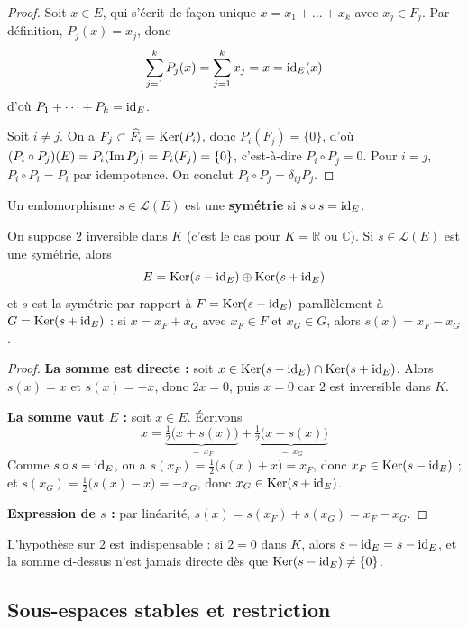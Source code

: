 \begin{proof}
Soit $x\in E$, qui s'écrit de façon unique $x=x_1+\dots+x_k$ avec $x_j\in F_j$. Par définition, $P_j(x)=x_j$, donc
\[\sum_{j=1}^{k} P_j(x) = \sum_{j=1}^{k} x_j = x = \operatorname{id}_E(x)\]
d'où $P_1+\dots+P_k=\operatorname{id}_E$.

Soit $i\neq j$. On a $F_j\subset \widehat{F_i} = \operatorname{Ker}(P_i)$, donc $P_i(F_j)=\{0\}$, d'où $(P_i\circ P_j)(E) = P_i(\operatorname{Im} P_j) = P_i(F_j) = \{0\}$, c'est-à-dire $P_i\circ P_j=0$. Pour $i=j$, $P_i\circ P_i = P_i$ par idempotence. On conclut $P_i\circ P_j=\delta_{ij}P_j$.
\end{proof}

\begin{defi}[Symétrie]
\label{defi:symetrie}
Un endomorphisme $s\in\mathcal{L}(E)$ est une \textbf{symétrie} si $s\circ s=\operatorname{id}_E$.
\end{defi}

\begin{prop}
\label{prop:symetrie}
On suppose $2$ inversible dans $K$ (c'est le cas pour $K=\mathbb{R}$ ou $\mathbb{C}$). Si $s\in\mathcal{L}(E)$ est une symétrie, alors
\[E = \operatorname{Ker}(s-\operatorname{id}_E)\oplus\operatorname{Ker}(s+\operatorname{id}_E)\]
et $s$ est la symétrie par rapport à $F=\operatorname{Ker}(s-\operatorname{id}_E)$ parallèlement à $G=\operatorname{Ker}(s+\operatorname{id}_E)$ : si $x=x_F+x_G$ avec $x_F\in F$ et $x_G\in G$, alors $s(x)=x_F-x_G$.
\end{prop}

\begin{proof}
\textbf{La somme est directe :} soit $x\in\operatorname{Ker}(s-\operatorname{id}_E)\cap\operatorname{Ker}(s+\operatorname{id}_E)$. Alors $s(x)=x$ et $s(x)=-x$, donc $2x=0$, puis $x=0$ car $2$ est inversible dans $K$.

\textbf{La somme vaut $E$ :} soit $x\in E$. Écrivons
\[x = \underbrace{\tfrac12\big(x+s(x)\big)}_{=\,x_F} + \underbrace{\tfrac12\big(x-s(x)\big)}_{=\,x_G}\]
Comme $s\circ s=\operatorname{id}_E$, on a $s(x_F)=\tfrac12\big(s(x)+x\big)=x_F$, donc $x_F\in\operatorname{Ker}(s-\operatorname{id}_E)$ ; et $s(x_G)=\tfrac12\big(s(x)-x\big)=-x_G$, donc $x_G\in\operatorname{Ker}(s+\operatorname{id}_E)$.

\textbf{Expression de $s$ :} par linéarité, $s(x)=s(x_F)+s(x_G)=x_F-x_G$.
\end{proof}

\begin{remarque}
L'hypothèse sur $2$ est indispensable : si $2=0$ dans $K$, alors $s+\operatorname{id}_E=s-\operatorname{id}_E$, et la somme ci-dessus n'est jamais directe dès que $\operatorname{Ker}(s-\operatorname{id}_E)\neq\{0\}$.
\end{remarque}

\subsection{Sous-espaces stables et restriction}

